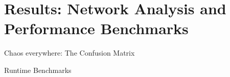 \section{Results: Network Analysis and Performance Benchmarks}
\begin{frame}{Chaos everywhere: The Confusion Matrix}
  \centering
\end{frame}

\begin{frame}{Runtime Benchmarks}
  \begin{table}[H]
    \centering
    \setlength{\belowcaptionskip}{0pt}
    \caption[Performance Benchmarks / Communication Overhead]{
      Performance benchmarks and communication overhead of the classification procedure on an Intel\textregistered \, i7-5600U CPU, including the encoding and decoding steps.
    }
\end{table}
\end{frame}
